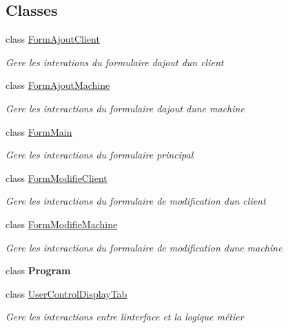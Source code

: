 \subsection*{Classes}
\begin{DoxyCompactItemize}
\item 
class \mbox{\hyperlink{class_m_t_connect_agent_1_1_form_ajout_client}{Form\+Ajout\+Client}}
\begin{DoxyCompactList}\small\item\em Gere les interations du formulaire d\textquotesingle{}ajout d\textquotesingle{}un client \end{DoxyCompactList}\item 
class \mbox{\hyperlink{class_m_t_connect_agent_1_1_form_ajout_machine}{Form\+Ajout\+Machine}}
\begin{DoxyCompactList}\small\item\em Gere les interactions du formulaire d\textquotesingle{}ajout d\textquotesingle{}une machine \end{DoxyCompactList}\item 
class \mbox{\hyperlink{class_m_t_connect_agent_1_1_form_main}{Form\+Main}}
\begin{DoxyCompactList}\small\item\em Gere les interactions du formulaire principal \end{DoxyCompactList}\item 
class \mbox{\hyperlink{class_m_t_connect_agent_1_1_form_modifie_client}{Form\+Modifie\+Client}}
\begin{DoxyCompactList}\small\item\em Gere les interactions du formulaire de modification d\textquotesingle{}un client \end{DoxyCompactList}\item 
class \mbox{\hyperlink{class_m_t_connect_agent_1_1_form_modifie_machine}{Form\+Modifie\+Machine}}
\begin{DoxyCompactList}\small\item\em Gere les interactions du formulaire de modification d\textquotesingle{}une machine \end{DoxyCompactList}\item 
class {\bfseries Program}
\item 
class \mbox{\hyperlink{class_m_t_connect_agent_1_1_user_control_display_tab}{User\+Control\+Display\+Tab}}
\begin{DoxyCompactList}\small\item\em Gere les interactions entre l\textquotesingle{}interface et la logique métier \end{DoxyCompactList}\end{DoxyCompactItemize}

